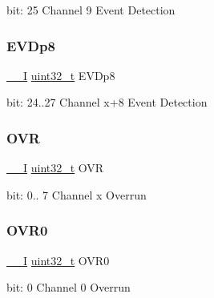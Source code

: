 bit\+: 25 Channel 9 Event Detection \mbox{\label{union_e_v_s_y_s___i_n_t_f_l_a_g___type_a582e64d183062cdd11a07d744884a429}} 
\subsubsection{\texorpdfstring{EVDp8}{EVDp8}}
{\footnotesize\ttfamily \mbox{\hyperlink{core__cm0plus_8h_af63697ed9952cc71e1225efe205f6cd3}{\+\_\+\+\_\+I}} \mbox{\hyperlink{union_e_v_s_y_s___i_n_t_f_l_a_g___type_a7c2ec0f7b3f1314bdede58b182af397c}{uint32\+\_\+t}} E\+V\+Dp8}

bit\+: 24..27 Channel x+8 Event Detection \mbox{\label{union_e_v_s_y_s___i_n_t_f_l_a_g___type_ab5e7dca180f0998ebc974c019c6b0279}} 
\subsubsection{\texorpdfstring{OVR}{OVR}}
{\footnotesize\ttfamily \mbox{\hyperlink{core__cm0plus_8h_af63697ed9952cc71e1225efe205f6cd3}{\+\_\+\+\_\+I}} \mbox{\hyperlink{union_e_v_s_y_s___i_n_t_f_l_a_g___type_a7c2ec0f7b3f1314bdede58b182af397c}{uint32\+\_\+t}} O\+VR}

bit\+: 0.. 7 Channel x Overrun \mbox{\label{union_e_v_s_y_s___i_n_t_f_l_a_g___type_ad293db33abcf72a8726cb982538d1357}} 
\subsubsection{\texorpdfstring{OVR0}{OVR0}}
{\footnotesize\ttfamily \mbox{\hyperlink{core__cm0plus_8h_af63697ed9952cc71e1225efe205f6cd3}{\+\_\+\+\_\+I}} \mbox{\hyperlink{union_e_v_s_y_s___i_n_t_f_l_a_g___type_a7c2ec0f7b3f1314bdede58b182af397c}{uint32\+\_\+t}} O\+V\+R0}

bit\+: 0 Channel 0 Overrun \mbox{\label{union_e_v_s_y_s___i_n_t_f_l_a_g___type_a1ec0f3f8556b5739e94b4cba65beb9be}} 
